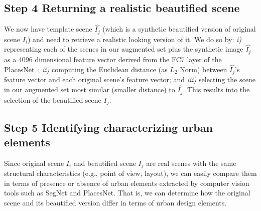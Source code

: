 \subsection*{Step 4 Returning a realistic beautified scene}
 We now have template scene $\hat{I_j}$ (which is a synthetic beautified version of original scene $I_i$) and need to retrieve a realistic looking version of it. We do so by: \emph{i)} representing 
each of the scenes in our augmented set plus the synthetic image $\hat{I_j}$ as a 4096 dimensional feature vector derived from the FC7 layer of the PlacesNet~\cite{zhou2014learning}; \emph{ii)} computing the Euclidean distance (as $L_2$ Norm) between $\hat{I_j}$'s feature vector and each  original scene's feature vector; and \emph{iii)} selecting the  scene  in our augmented set most similar (smaller distance) to $\hat{I_j}$. This results into the selection of the beautified scene $I_j$.
 
 
\subsection*{Step 5 Identifying  characterizing urban elements}
Since original scene $I_i$ and beautified scene $I_j$ are real scenes with the  same structural characteristics (e.g., point of view, layout), we can easily compare them in terms of presence or absence of urban elements extracted by computer vision tools such as SegNet and PlacesNet. That is, we can determine how the original scene and its beautified version differ in terms of urban design elements. 
 
 


